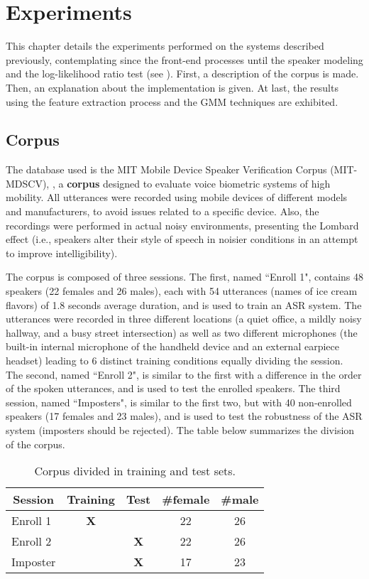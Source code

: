 \chapter{Experiments}
\label{ch:experiments}

This chapter details the experiments performed on the systems described previously, contemplating since the front-end processes until the speaker modeling and the log-likelihood ratio test (see ). First, a description of the corpus is made. Then, an explanation about the implementation is given. At last, the results using the feature extraction process and the GMM techniques are exhibited.

\section{Corpus}
\label{sec:corpus}

The database used is the MIT Mobile Device Speaker Verification Corpus (MIT-MDSCV), , a \textbf{corpus} designed to evaluate voice biometric systems of high mobility. All utterances were recorded using mobile devices of different models and manufacturers, to avoid issues related to a specific device. Also, the recordings were performed in actual noisy environments, presenting the Lombard effect (i.e., speakers alter their style of speech in noisier conditions in an attempt to improve intelligibility).

The corpus is composed of three sessions. The first, named ``Enroll 1", contains 48 speakers (22 females and 26 males), each with 54 utterances (names of ice cream flavors) of 1.8 seconds average duration, and is used to train an ASR system. The utterances were recorded in three different locations (a quiet office, a mildly noisy hallway, and a busy street intersection) as well as two different microphones (the built-in internal microphone of the handheld device and an external earpiece headset) leading to 6 distinct training conditions equally dividing the session. The second, named ``Enroll 2", is similar to the first with a difference in the order of the spoken utterances, and is used to test the enrolled speakers. The third session, named ``Imposters", is similar to the first two, but with 40 non-enrolled speakers (17 females and 23 males), and is used to test the robustness of the ASR system (imposters should be rejected). The table below summarizes the division of the corpus.

\begin{table}[h]
    \centering
    \begin{tabular}{|l|c|c|c|c|}
    \hline
    \multicolumn{1}{|c|}{{\bf Session}} & {\bf Training} & {\bf Test} & {\bf \#female} & {\bf \#male} \\ \hline
    Enroll 1 & {\bf X} & {\bf } & 22 & 26 \\ \hline
    Enroll 2 & {\bf } & {\bf X} & 22 & 26 \\ \hline
    Imposter & {\bf } & {\bf X} & 17 & 23 \\ \hline
    \end{tabular}
    \caption{Corpus divided in training and test sets.}
    \label{tab:corpus-division}
\end{table}

